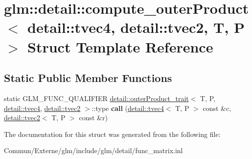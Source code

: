 \hypertarget{structglm_1_1detail_1_1compute__outer_product_3_01detail_1_1tvec4_00_01detail_1_1tvec2_00_01_t_00_01_p_01_4}{}\section{glm\+:\+:detail\+:\+:compute\+\_\+outer\+Product$<$ detail\+:\+:tvec4, detail\+:\+:tvec2, T, P $>$ Struct Template Reference}
\label{structglm_1_1detail_1_1compute__outer_product_3_01detail_1_1tvec4_00_01detail_1_1tvec2_00_01_t_00_01_p_01_4}
\subsection*{Static Public Member Functions}
\begin{DoxyCompactItemize}
\item 
static G\+L\+M\+\_\+\+F\+U\+N\+C\+\_\+\+Q\+U\+A\+L\+I\+F\+I\+ER \hyperlink{structglm_1_1detail_1_1outer_product__trait}{detail\+::outer\+Product\+\_\+trait}$<$ T, P, \hyperlink{structglm_1_1detail_1_1tvec4}{detail\+::tvec4}, \hyperlink{structglm_1_1detail_1_1tvec2}{detail\+::tvec2} $>$\+::type {\bfseries call} (\hyperlink{structglm_1_1detail_1_1tvec4}{detail\+::tvec4}$<$ T, P $>$ const \&c, \hyperlink{structglm_1_1detail_1_1tvec2}{detail\+::tvec2}$<$ T, P $>$ const \&r)\hypertarget{structglm_1_1detail_1_1compute__outer_product_3_01detail_1_1tvec4_00_01detail_1_1tvec2_00_01_t_00_01_p_01_4_a7ae9fc8b98d19655b6cb21fc1ff997b2}{}\label{structglm_1_1detail_1_1compute__outer_product_3_01detail_1_1tvec4_00_01detail_1_1tvec2_00_01_t_00_01_p_01_4_a7ae9fc8b98d19655b6cb21fc1ff997b2}

\end{DoxyCompactItemize}


The documentation for this struct was generated from the following file\+:\begin{DoxyCompactItemize}
\item 
Commun/\+Externe/glm/include/glm/detail/func\+\_\+matrix.\+inl\end{DoxyCompactItemize}
